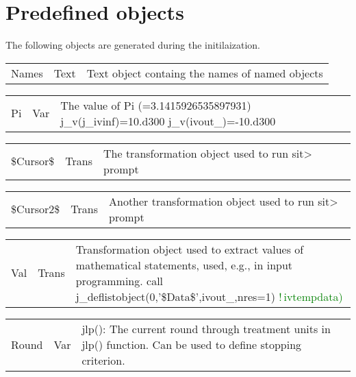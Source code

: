 \section{Predefined objects}
\label{pref}
 The following objects are generated during the initilaization.
\begin{table}[H]
 \begin{tabular}{ m{}  m{} p{}}
 Names& Text& Text object containg the names of named objects
\end{tabular}
\end{table}
\vspace{-1.51em}
\begin{table}[H]
 \begin{tabular}{ m{}  m{} p{}}
 Pi&Var&The value of Pi (=3.1415926535897931)
j\_v(j\_ivinf)=10.d300
j\_v(ivout\_)=-10.d300
\end{tabular}
\end{table}
\vspace{-1.51em}
\begin{table}[H]
 \begin{tabular}{ m{}  m{} p{}}
 \$Cursor\$& Trans & The transformation object used to run sit> prompt
\end{tabular}
\end{table}
\vspace{-1.51em}
\begin{table}[H]
 \begin{tabular}{ m{}  m{} p{}}
 \$Cursor2\$& Trans & Another transformation object used to run sit> prompt
\end{tabular}
\end{table}
\vspace{-1.51em}
\begin{table}[H]
 \begin{tabular}{ m{}  m{} p{}}
 Val&Trans& Transformation object used to extract values of mathematical statements, used,
 e.g., in input programming.
	 call j\_deflistobject(0,'\$Data\$',ivout\_,nres=1) \textcolor{green}{!\,ivtempdata)}
\end{tabular}
\end{table}
\vspace{-1.51em}
\begin{table}[H]
 \begin{tabular}{ m{}  m{} p{}}
Round &Var& \textcolor{VioletRed}{jlp}(): The current round through treatment units in \textcolor{VioletRed}{jlp}() function.
 Can be used to define stopping criterion.
\end{tabular}
\end{table}
